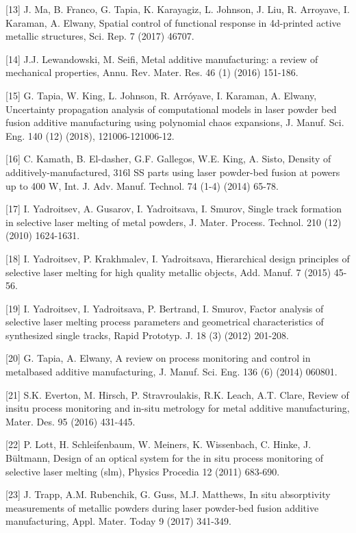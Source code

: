 \documentclass[10pt]{article}
\begin{document}
[13] J. Ma, B. Franco, G. Tapia, K. Karayagiz, L. Johnson, J. Liu, R. Arroyave, I. Karaman, A. Elwany, Spatial control of functional response in 4d-printed active metallic structures, Sci. Rep. 7 (2017) 46707.

[14] J.J. Lewandowski, M. Seifi, Metal additive manufacturing: a review of mechanical properties, Annu. Rev. Mater. Res. 46 (1) (2016) 151-186.

[15] G. Tapia, W. King, L. Johnson, R. Arróyave, I. Karaman, A. Elwany, Uncertainty propagation analysis of computational models in laser powder bed fusion additive manufacturing using polynomial chaos expansions, J. Manuf. Sci. Eng. 140 (12) (2018), 121006-121006-12.

[16] C. Kamath, B. El-dasher, G.F. Gallegos, W.E. King, A. Sisto, Density of additively-manufactured, $316 \mathrm{l}$ SS parts using laser powder-bed fusion at powers up to 400 W, Int. J. Adv. Manuf. Technol. 74 (1-4) (2014) 65-78.

[17] I. Yadroitsev, A. Gusarov, I. Yadroitsava, I. Smurov, Single track formation in selective laser melting of metal powders, J. Mater. Process. Technol. 210 (12) (2010) 1624-1631.

[18] I. Yadroitsev, P. Krakhmalev, I. Yadroitsava, Hierarchical design principles of selective laser melting for high quality metallic objects, Add. Manuf. 7 (2015) 45-56.

[19] I. Yadroitsev, I. Yadroitsava, P. Bertrand, I. Smurov, Factor analysis of selective laser melting process parameters and geometrical characteristics of synthesized single tracks, Rapid Prototyp. J. 18 (3) (2012) 201-208.

[20] G. Tapia, A. Elwany, A review on process monitoring and control in metalbased additive manufacturing, J. Manuf. Sci. Eng. 136 (6) (2014) 060801.

[21] S.K. Everton, M. Hirsch, P. Stravroulakis, R.K. Leach, A.T. Clare, Review of insitu process monitoring and in-situ metrology for metal additive manufacturing, Mater. Des. 95 (2016) 431-445.

[22] P. Lott, H. Schleifenbaum, W. Meiners, K. Wissenbach, C. Hinke, J. Bültmann, Design of an optical system for the in situ process monitoring of selective laser melting (slm), Physics Procedia 12 (2011) 683-690.

[23] J. Trapp, A.M. Rubenchik, G. Guss, M.J. Matthews, In situ absorptivity measurements of metallic powders during laser powder-bed fusion additive\\
manufacturing, Appl. Mater. Today 9 (2017) 341-349.
\end{document}
